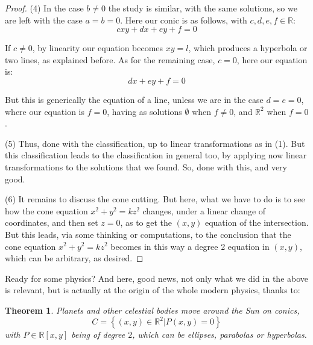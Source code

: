 \documentclass[12pt]{amsbook}
\newtheorem{theorem}{Theorem}[chapter]
\begin{document}
\begin{proof}
\medskip

(4) In the case $b\neq0$ the study is similar, with the same solutions, so we are left with the case $a=b=0$. Here our conic is as follows, with $c,d,e,f\in\mathbb R$:
$$cxy+dx+ey+f=0$$

If $c\neq 0$, by linearity our equation becomes $xy=l$, which produces a hyperbola or two lines, as explained before. As for the remaining case, $c=0$, here our equation is:
$$dx+ey+f=0$$

But this is generically the equation of a line, unless we are in the case $d=e=0$, where our equation is $f=0$, having as solutions $\emptyset$ when $f\neq0$, and $\mathbb R^2$ when $f=0$.

\medskip

(5) Thus, done with the classification, up to linear transformations as in (1). But this classification leads to the classification in general too, by applying now linear transformations to the solutions that we found. So, done with this, and very good.

\medskip

(6) It remains to discuss the cone cutting. But here, what we have to do is to see how the cone equation $x^2+y^2=kz^2$ changes, under a linear change of coordinates, and then set $z=0$, as to get the $(x,y)$ equation of the intersection. But this leads, via some thinking or computations, to the conclusion that the cone equation $x^2+y^2=kz^2$ becomes in this way a degree 2 equation in $(x,y)$, which can be arbitrary, as desired.
\end{proof}

Ready for some physics? And here, good news, not only what we did in the above is relevant, but is actually at the origin of the whole modern physics, thanks to:


\begin{theorem}
Planets and other celestial bodies move around the Sun on conics,
$$C=\left\{(x,y)\in\mathbb R^2\Big|P(x,y)=0\right\}$$
with $P\in\mathbb R[x,y]$ being of degree $2$, which can be ellipses, parabolas or hyperbolas.
\end{theorem}
\end{document}

